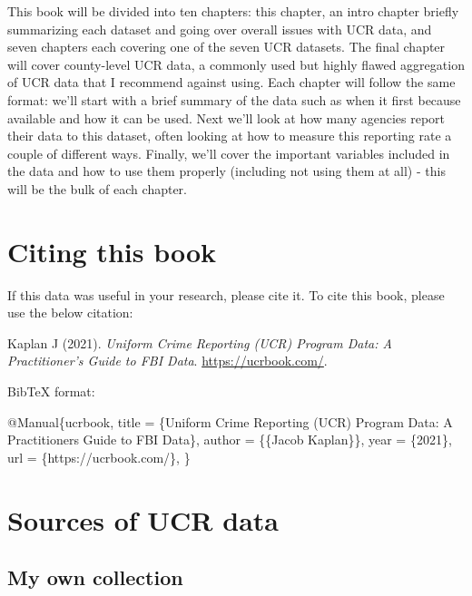 \documentclass[
  12pt,
  openany]{book}
\newenvironment{Shaded}{\begin{snugshade}}{\end{snugshade}}
\newcommand{\DataTypeTok}[1]{\textcolor[rgb]{0.27,0.27,0.27}{#1}}
\newcommand{\NormalTok}[1]{#1}
\newcommand{\OtherTok}[1]{\textcolor[rgb]{0.37,0.37,0.37}{#1}}
\newcommand{\VariableTok}[1]{\textcolor[rgb]{0,0,0}{#1}}
\begin{document}
This book will be divided into ten chapters: this chapter, an intro chapter briefly summarizing each dataset and going over overall issues with UCR data, and seven chapters each covering one of the seven UCR datasets. The final chapter will cover county-level UCR data, a commonly used but highly flawed aggregation of UCR data that I recommend against using. Each chapter will follow the same format: we'll start with a brief summary of the data such as when it first because available and how it can be used. Next we'll look at how many agencies report their data to this dataset, often looking at how to measure this reporting rate a couple of different ways. Finally, we'll cover the important variables included in the data and how to use them properly (including not using them at all) - this will be the bulk of each chapter.

\section{Citing this book}\label{citing-this-book}

If this data was useful in your research, please cite it. To cite this book, please use the below citation:

Kaplan J (2021). \emph{Uniform Crime Reporting (UCR) Program Data: A Practitioner's Guide to FBI Data}. \url{https://ucrbook.com/}.

BibTeX format:

\begin{Shaded}
\begin{Highlighting}[]
\VariableTok{@Manual}\NormalTok{\{}\OtherTok{ucrbook}\NormalTok{,}
  \DataTypeTok{title}\NormalTok{ = \{Uniform Crime Reporting (UCR) Program Data: A Practitioner\textquotesingle{}s Guide to FBI Data\},}
  \DataTypeTok{author}\NormalTok{ = \{\{Jacob Kaplan\}\},}
  \DataTypeTok{year}\NormalTok{ = \{2021\},}
  \DataTypeTok{url}\NormalTok{ = \{https://ucrbook.com/\},}
\NormalTok{\}}
\end{Highlighting}
\end{Shaded}

\section{Sources of UCR data}\label{sources-of-ucr-data}

\subsection{My own collection}\label{my-own-collection}
\end{document}
